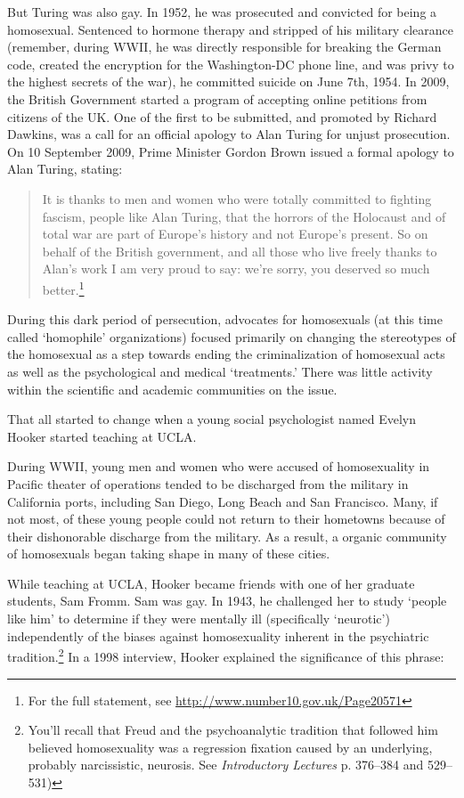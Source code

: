 \begin{refsection}
But Turing was also gay. In 1952, he was prosecuted and convicted for being a homosexual. Sentenced to hormone therapy and stripped of his military clearance (remember, during WWII, he was directly responsible for breaking the German code, created the encryption for the Washington-DC phone line, and was privy to the highest secrets of the war), he committed suicide on June 7th, 1954. In 2009, the British Government started a program of accepting online petitions from citizens of the UK. One of the first to be submitted, and promoted by Richard Dawkins, was a call for an official apology to Alan Turing for unjust prosecution. On 10 September 2009, Prime Minister Gordon Brown issued a formal apology to Alan Turing, stating:

\begin{quote}

It is thanks to men and women who were totally committed to fighting fascism, people like Alan Turing, that the horrors of the Holocaust and of total war are part of Europe’s history and not Europe’s present. So on behalf of the British government, and all those who live freely thanks to Alan’s work I am very proud to say: we’re sorry, you deserved so much better.\footnote{For the full statement, see \url{http://www.number10.gov.uk/Page20571}}
\end{quote}

During this dark period of persecution, advocates for homosexuals (at this time called `homophile' organizations) focused primarily on changing the stereotypes of the homosexual as a step towards ending the criminalization of homosexual acts as well as the psychological and medical `treatments.' There was little activity within the scientific and academic communities on the issue. 

That all started to change when a young social psychologist named Evelyn Hooker started teaching at UCLA.

During WWII, young men and women who were accused of homosexuality in Pacific theater of operations tended to be discharged from the military in California ports, including San Diego, Long Beach and San Francisco. Many, if not most, of these young people could not return to their hometowns because of their dishonorable discharge from the military. As a result, a organic community of homosexuals began taking shape in many of these cities.

While teaching at UCLA, Hooker became friends with one of her graduate students, Sam Fromm. Sam was gay. In 1943, he challenged her to study `people like him' to determine if they were mentally ill (specifically `neurotic') independently of the biases against homosexuality inherent in the psychiatric tradition.\footnote{You'll recall that Freud and the psychoanalytic tradition that followed him believed homosexuality was a regression fixation caused by an underlying, probably narcissistic, neurosis. See \emph{Introductory Lectures} p. 376--384 and 529--531)} In a 1998 interview, Hooker explained the significance of this phrase:


\end{refsection}
